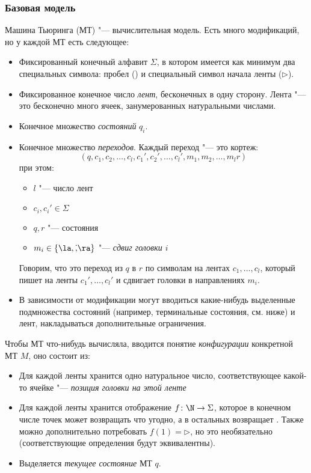 \subsubsection{Базовая модель}
	Машина Тьюринга (МТ) "--- вычислительная модель.
	Есть много модификаций, но у каждой МТ есть следующее:
	\begin{itemize}
		\item
			Фиксированный конечный алфавит $\Sigma$, в котором имеется как минимум два специальных символа: пробел (\textvisiblespace) и
			специальный символ начала ленты ($\triangleright$).
		\item
			Фиксированное конечное число \textit{лент}, бесконечных в одну сторону.
			Лента "--- это бесконечно много ячеек, занумерованных натуральными числами.
		\item Конечное множество \textit{состояний} $q_i$.
		\item Конечное множество \textit{переходов}.
			Каждый переход "--- это кортеж:
			\[ (q, c_1, c_2, \dots, c_l, c_1', c_2', \dots, c_l', m_1, m_2, \dots, m_l r) \]
			при этом:
			\begin{itemize}
				\item $l$ "--- число лент
				\item $c_i, c_i' \in \Sigma$
				\item $q, r$ "--- состояния
				\item $m_i \in \{\la, \dot, \ra\}$ "--- \textit{сдвиг головки $i$}
			\end{itemize}
			Говорим, что это переход из $q$ в $r$ по символам на лентах $c_1, \dots, c_l$, который пишет на ленты $c_1', \dots, c_l'$
			и сдвигает головки в направлениях $m_i$.
		\item В зависимости от модификации могут вводиться какие-нибудь выделенные подмножества состояний (например, терминальные состояния, см. ниже) и лент, накладываться дополнительные ограничения.
	\end{itemize}
	Чтобы МТ что-нибудь вычисляла, вводится понятие \textit{конфигурации} конкретной МТ $M$, оно состоит из:
	\begin{itemize}
		\item Для каждой ленты хранится одно натуральное число, соответствующее какой-то ячейке "--- \textit{позиция головки на этой ленте}
		\item
			Для каждой ленты хранится отображение $f \colon \N \to \Sigma$, которое в конечном числе точек может возвращать что угодно, а в остальных возвращает \textvisiblespace.
			Также можно дополнительно потребовать $f(1)=\triangleright$, но это необязательно (соответствующие определения будут эквивалентны).
		\item
			Выделяется \textit{текущее состояние} МТ $q$.
	\end{itemize}
